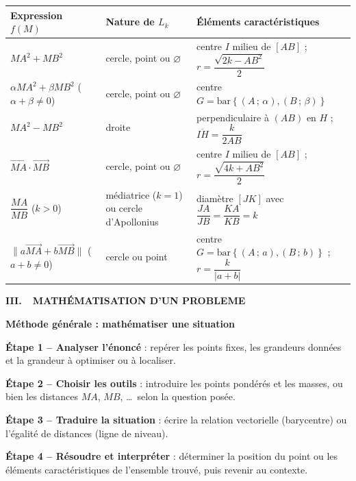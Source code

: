 \documentclass[10pt,a4paper]{article}
\newcommand{\vc}[1]{\overrightarrow{#1}}                     %
\newcommand{\barG}[1]{\mathrm{bar}\left\{#1\right\}}          %
\newcommand{\partie}[2]{%
  \par\needspace{5\baselineskip}\addvspace{10pt}%
  \noindent\colorbox{cPartie}{\parbox{\dimexpr\linewidth-2\fboxsep}{\color{white}\bfseries\large #1.\ \ #2}}\par\addvspace{7pt}}
\newenvironment{encadre}[3][10]{%
  \par\needspace{#1\baselineskip}\addvspace{6pt}\noindent
  \def\encColor{#2}%
  \begin{lrbox}{\encbox}%
  \begin{minipage}{\dimexpr\linewidth-2\fboxsep-2\fboxrule-0.5pt\relax}%
  \raggedright{\color{#2}\bfseries #3}\par\smallskip}%
  {\end{minipage}\end{lrbox}%
  \noindent\fcolorbox{\encColor}{\encColor!7}{\usebox{\encbox}}\par\addvspace{6pt}}
\renewcommand{\arraystretch}{1.25}
\begin{document}
\begin{center}
{\setlength{\arrayrulewidth}{0.7pt}
\renewcommand{\arraystretch}{1.5}
\begin{tabular}{|L{5.9cm}|L{4.5cm}|L{5.9cm}|}
\hline
{}\textbf{Expression $f(M)$} & \textbf{Nature de $L_k$} & \textbf{Éléments caractéristiques}\\
\hline
$MA^2+MB^2$ & cercle, point ou $\varnothing$ & centre $I$ milieu de $[AB]$ ; $r=\dfrac{\sqrt{2k-AB^2}}{2}$\\
\hline
$\alpha MA^2+\beta MB^2$ ($\alpha+\beta\neq0$) & cercle, point ou $\varnothing$ & centre $G=\barG{(A\,;\,\alpha),(B\,;\,\beta)}$\\
\hline
$MA^2-MB^2$ & droite & perpendiculaire à $(AB)$ en $H$ ; $\overline{IH}=\dfrac{k}{2AB}$\\
\hline
$\vc{MA}\cdot\vc{MB}$ & cercle, point ou $\varnothing$ & centre $I$ milieu de $[AB]$ ; $r=\dfrac{\sqrt{4k+AB^2}}{2}$\\
\hline
$\dfrac{MA}{MB}$ ($k>0$) & médiatrice ($k=1$) ou cercle d'Apollonius & diamètre $[JK]$ avec $\dfrac{JA}{JB}=\dfrac{KA}{KB}=k$\\
\hline
$\lVert a\vc{MA}+b\vc{MB}\rVert$ ($a+b\neq0$) & cercle ou point & centre $G=\barG{(A\,;\,a),(B\,;\,b)}$ ; $r=\dfrac{k}{|a+b|}$\\
\hline
\end{tabular}}
\end{center}

\clearpage
\partie{III}{MATHÉMATISATION D'UN PROBLEME}

\begin{encadre}[14]{cMeth}{Méthode générale : mathématiser une situation}
\textbf{Étape 1 -- Analyser l'énoncé} : repérer les points fixes, les grandeurs données et la grandeur à optimiser ou à localiser.\par
\textbf{Étape 2 -- Choisir les outils} : introduire les points pondérés et les masses, ou bien les distances $MA$, $MB$, \dots\ selon la question posée.\par
\textbf{Étape 3 -- Traduire la situation} : écrire la relation vectorielle (barycentre) ou l'égalité de distances (ligne de niveau).\par
\textbf{Étape 4 -- Résoudre et interpréter} : déterminer la position du point ou les éléments caractéristiques de l'ensemble trouvé, puis revenir au contexte.
\end{encadre}
\end{document}
